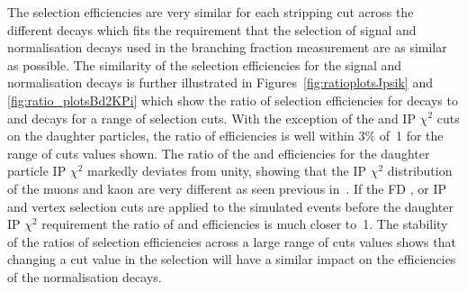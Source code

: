 The selection efficiencies are very similar for each stripping cut across the different decays which fits the requirement that the selection of signal and normalisation decays used in the branching fraction measurement are as similar as possible. The similarity of the selection efficiencies for the signal and normalisation decays is further illustrated in Figures~\ref{fig:ratioplotsJpsik} and \ref{fig:ratio_plotsBd2KPi} which show the ratio of selection efficiencies for \bsmumu decays to \bujpsik and \bdkpi decays for a range of selection cuts. With the exception of the \bsmumu and \bujpsik IP $\chi^{2}$ cuts on the daughter particles, the ratio of efficiencies is well within $3\%$ of~1 for the range of cuts values shown. The ratio of the \bsmumu and \bujpsik efficiencies for the daughter particle IP $\chi^{2}$ markedly deviates from unity, showing that the IP $\chi^{2}$ distribution of the muons and kaon are very different as seen previous in~\cite{Diego}. If the FD \chisqd, \bs or \jpsi IP \chisqd and vertex \chisqd selection cuts are applied to the simulated events before the daughter IP $\chi^{2}$ requirement the ratio of \bmumu and \bujpsik efficiencies is much closer to~1. The stability of the ratios of selection efficiencies across a large range of cuts values shows that changing a cut value in the \bmumu selection will have a similar impact on the efficiencies of the normalisation decays. 


